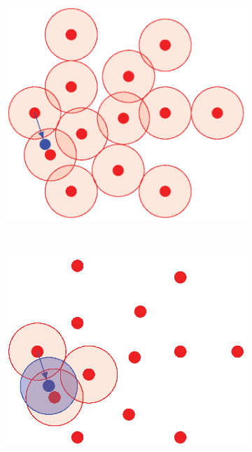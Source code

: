 \begin{figure}[th!]
  \centering
  \begin{subfigure}[b]{.48\textwidth}
      \includegraphics[width=\linewidth]{figures/ch_generic_approach/coding_scheme_5}
      \caption{}
      \label{fig:coding_scheme_cartoon_5}
  \end{subfigure}
  \\[.5cm]
  \begin{subfigure}[b]{.48\textwidth}
      \includegraphics[width=\linewidth]{figures/ch_generic_approach/coding_scheme_6}

\end{subfigure}
\end{figure}
